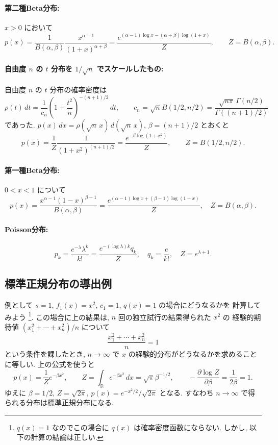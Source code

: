 \documentclass[12pt,twoside]{jarticle}
\newcommand\R{{\mathbb R}} %
\renewcommand\d{\partial}
\theoremstyle{definition} %
\theoremstyle{definition} %
\theoremstyle{definition} %
\numberwithin{theorem}{section}
\numberwithin{equation}{section}
\numberwithin{figure}{section}
\numberwithin{table}{section}
\begin{document}
\paragraph{第二種Beta分布:} $x>0$ において
\[
p(x)
=\frac{1}{B(\alpha,\beta)}\frac{x^{\alpha-1}}{(1+x)^{\alpha+\beta}}
=\frac{e^{(\alpha-1)\log x-(\alpha+\beta)\log(1+x)}}{Z},
\qquad
Z=B(\alpha,\beta).
\]

\paragraph{自由度 $n$ の $t$ 分布を $1/\sqrt{n}$ でスケールしたもの:}
自由度 $n$ の $t$ 分布の確率密度は
\[
\rho(t)\,dt
=
\frac{1}{c_n} \left(1+\frac{t^2}{n}\right)^{-(n+1)/2}\,dt,
\qquad
c_n=\sqrt{n}B(1/2,n/2)
=\frac{\sqrt{n\pi}\,\Gamma(n/2)}{\Gamma((n+1)/2)}
\]
であった. 
$p(x)\,dx=\rho(\sqrt{n}\,x)\,d(\sqrt{n}\,x)$, $\beta=(n+1)/2$ とおくと
\[
p(x)
=\frac{1}{Z}\frac{1}{(1+x^2)^{(n+1)/2}}
=\frac{e^{-\beta\log(1+x^2)}}{Z}, 
\qquad
Z=B(1/2,n/2).
\]

\paragraph{第一種Beta分布:} $0<x<1$ について
\[
p(x)
=\frac{x^{\alpha-1}(1-x)^{\beta-1}}{B(\alpha,\beta)}
=\frac{e^{(\alpha-1)\log x+(\beta-1)\log(1-x)}}{Z},
\quad
Z=B(\alpha,\beta).
\]

\paragraph{Poisson分布:}
\[
p_k 
= \frac{e^{-\lambda}\lambda^k}{k!}
=\frac{e^{-(\log\lambda)k}q_k}{Z},
\quad  
q_k=\frac{e}{k!},
\quad
Z=e^{\lambda+1}.
\]


\subsection{標準正規分布の導出例}
\label{sec:normal-Gibbs}

例として $s=1$, $f_1(x)=x^2$, $c_1=1$, $q(x)=1$ の場合にどうなるかを
計算してみよう%
\footnote{$q(x)=1$ なのでこの場合に $q(x)$ は確率密度函数にならない.
しかし, 以下の計算の結論は正しい.}.
この場合に上の結果は, $n$ 回の独立試行の結果得られた $x^2$ の
経験的期待値 $(x_1^2+\cdots+x_n^2)/n$ について
\[
\frac{x_1^2+\cdots+x_n^2}{n}=1
\]
という条件を課したとき, 
$n\to\infty$ で $x$ の経験的分布がどうなるかを求めることに等しい.
上の公式を使うと
\[
p(x)=\frac{1}{Z}e^{-\beta x^2}, \qquad
Z=\int_\R e^{-\beta x^2}\,dx=\sqrt{\pi}\beta^{-1/2}, \qquad
-\frac{\d\log Z}{\d\beta}=\frac{1}{2\beta}=1.
\]
ゆえに $\beta=1/2$, $Z=\sqrt{2\pi}$, $p(x)=e^{-x^2/2}/\sqrt{2\pi}$ となる.
すなわち $n\to\infty$ で得られる分布は標準正規分布になる.
\end{document}
